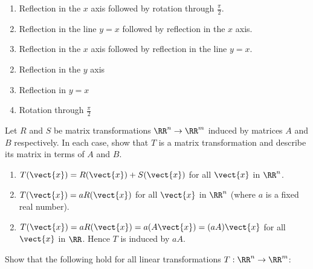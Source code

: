 \begin{multicols}{2}
\begin{ex}
\begin{enumerate}[label={\alph*.}]
\item Reflection in the $x$ axis followed by rotation through $\frac{\pi}{2}$.

\item Reflection in the line $y = x$ followed by reflection in the $x$ axis.

\item Reflection in the $x$ axis followed by reflection in the line $y = x$.

\end{enumerate}
\begin{sol}
\begin{enumerate}[label={\alph*.}]
\setcounter{enumi}{1}
\item  Reflection in the $y$ axis

\setcounter{enumi}{3}
\item  Reflection in $y = x$

\setcounter{enumi}{5}
\item  Rotation through $\frac{\pi}{2}$

\end{enumerate}
\end{sol}
\end{ex}

\begin{ex}
Let $R$ and $S$ be matrix transformations $\RR^n \to \RR^m$ induced by matrices $A$ and $B$ respectively. In each case, show that $T$ is a matrix transformation and describe its matrix in terms of $A$ and $B$.

\begin{enumerate}[label={\alph*.}]
\item $T(\vect{x}) = R(\vect{x}) + S(\vect{x})$ for all $\vect{x}$ in $\RR^n$.

\item $T(\vect{x}) = aR(\vect{x})$ for all $\vect{x}$ in $\RR^n$ (where $a$ is a fixed real number).

\end{enumerate}
\begin{sol}
\begin{enumerate}[label={\alph*.}]
\setcounter{enumi}{1}
\item  $T(\vect{x}) = aR(\vect{x}) = a(A\vect{x}) = (aA)\vect{x}$ for all $\vect{x}$ in $\RR$. Hence $T$ is induced by $aA$.

\end{enumerate}
\end{sol}
\end{ex}

\begin{ex}
Show that the following hold for all linear transformations $T : \RR^n \to \RR^m$:


\end{ex}
\end{multicols}
